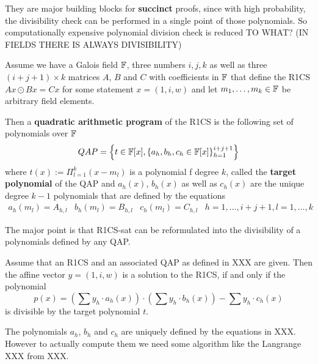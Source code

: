 They are major building blocks for \textbf{succinct} proofs, since with high probability, the divisibility check can be performed in a single point of those polynomials. So computationally expensive polynomial division check is reduced TO WHAT? (IN FIELDS THERE IS ALWAYS DIVISIBILITY) 

\begin{definition}
Assume we have a Galois field $\mathbb{F}$, three numbers $i,j,k$ as well as three $(i+j+1) \times k$ matrices $A$, $B$ and $C$  with coefficients in $\mathbb{F}$ that define the R1CS
$Ax \odot Bx = Cx $ for some statement $x=(1,i,w)$ and let $m_1,\ldots,m_k\in \mathbb{F}$ be arbitrary field elements. 

Then a \textbf{quadratic arithmetic program} of the R1CS is the following set of polynomials over $\mathbb{F}$
$$
QAP = \left\{t\in \mathbb{F}[x],\left\{a_h,b_h,c_h\in \mathbb{F}[x]\right\}_{h=1}^{i+j+1}\right\}
$$
where $t(x) := \Pi_{l=1}^k (x- m_l)$ is a polynomial f degree $k$, called the \textbf{target polynomial} of the QAP and $a_h(x)$, $b_h(x)$ as well as $c_h(x)$ are the unique degree $k-1$ polynomials that are defined by the equations
$$
\begin{array}{lllr}
a_h(m_l)=A_{h,l} & b_h(m_l)=B_{h,l} & c_h(m_l)=C_{h,l} & h= 1, \ldots , i+j+1, l=1,\ldots,k 
\end{array}
$$  
\end{definition}
The major point is that R1CS-sat can be reformulated into the divisibility of a polynomials defined by any QAP.
\begin{theorem}
Assume that an R1CS and an associated QAP as defined in XXX are given. Then the affine vector $y=(1,i,w)$ is a solution to the R1CS, if and only if the polynomial
$$
p(x) = \left(\sum y_h\cdot a_h(x)\right)\cdot \left(\sum y_h\cdot b_h(x)\right)  - \sum y_h\cdot c_h(x) 
$$
is divisible by the target polynomial $t$.
\end{theorem}

The polynomials $a_h$, $b_h$ and $c_h$ are uniquely defined by the equations in XXX. However to actually compute them we need some algorithm like the Langrange XXX from XXX.

